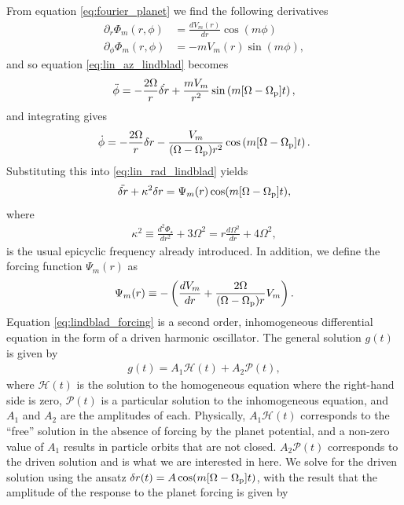 From equation \ref{eq:fourier_planet} we find the following derivatives
\begin{align}
    \partial_r \Phi_m (r, \phi) &= \frac{dV_m(r)}{dr} \cos (m \phi) \\
    \partial_\phi \Phi_m (r, \phi) &= - m V_m(r) \sin (m \phi),
\end{align}
and so equation \ref{eq:lin_az_lindblad} becomes
\begin{align}
    \ddot{\phi} = - \frac{2 \Omega}{r} \dot{\delta r} + \frac{m V_m}{r^2} \sin \left( m [ \Omega - \Omega_{\rm p}] t\right),
\end{align}
and integrating gives
\begin{align}
    \dot{\phi} = - \frac{2 \Omega}{r} \delta r - \frac{V_m}{(\Omega - \Omega_{\rm p}) r^2} \cos \left( m [ \Omega - \Omega_{\rm p}] t \right).
\end{align}
Substituting this into \ref{eq:lin_rad_lindblad} yields
\begin{align}
    \ddot{\delta r} + \kappa^2 \delta r = \Psi_m(r) \cos (m [ \Omega - \Omega_{\rm p}] t), \label{eq:lindblad_forcing}
\end{align}
where
\begin{align}
    \kappa^2 \equiv \frac{d^2 \Phi_\star}{dr^2} + 3 \Omega^2 = r \frac{d \Omega^2}{dr} + 4 \Omega^2,
\end{align}
is the usual epicyclic frequency already introduced. In addition, we define the forcing function $\Psi_m(r)$ as
\begin{align}
    \Psi_m(r) \equiv - \left( \frac{dV_m}{dr}+ \frac{2 \Omega}{(\Omega - \Omega_{\rm p})r} V_m \right).
\end{align}
Equation \ref{eq:lindblad_forcing} is a second order, inhomogeneous differential equation in the form of a driven harmonic oscillator.
The general solution $g(t)$ is given by 
\begin{align}
    g(t) = A_1 \mathcal{H}(t) + A_2 \mathcal{P}(t),
\end{align}
where $\mathcal{H}(t)$ is the solution to the homogeneous equation where the right-hand side is zero, $\mathcal{P}(t)$ is a particular solution to the inhomogeneous equation, and $A_1$ and $A_2$ are the amplitudes of each.
Physically, $A_1 \mathcal{H}(t)$ corresponds to the ``free'' solution in the absence of forcing by the planet potential, and a non-zero value of $A_1$ results in particle orbits that are not closed.
$A_2 \mathcal{P}(t)$ corresponds to the driven solution and is what we are interested in here.
We solve for the driven solution using the ansatz $\delta r (t) = A \cos (m [\Omega - \Omega_{\rm p}]t)$, with the result that the amplitude of the response to the planet forcing is given by 
